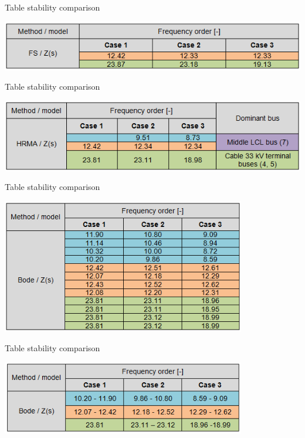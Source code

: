 \documentclass[12pt]{report} %
\begin{document}
\begin{table}[htb]
	\centering
	\caption{Table stability comparison}
	\includegraphics[width=1\textwidth]{img/Case123/stability_comparison_table_fs.png}
  	\label{tab:stability_comparison_table_fs}
\end{table}
\FloatBarrier

\begin{table}[htb]
	\centering
	\caption{Table stability comparison}
	\includegraphics[width=1\textwidth]{img/Case123/stability_comparison_table_hrma.png}
  	\label{tab:stability_comparison_table_hrma}
\end{table}
\FloatBarrier

\begin{table}[htb]
	\centering
	\caption{Table stability comparison}
	\includegraphics[width=0.8\textwidth]{img/Case123/stability_comparison_table_bode1.png}
  	\label{tab:stability_comparison_table_bode1}
\end{table}
\FloatBarrier

\begin{table}[htb]
	\centering
	\caption{Table stability comparison}
	\includegraphics[width=0.8\textwidth]{img/Case123/stability_comparison_table_bode2.png}
  	\label{tab:stability_comparison_table_bode2}
\end{table}
\FloatBarrier
\end{document}
